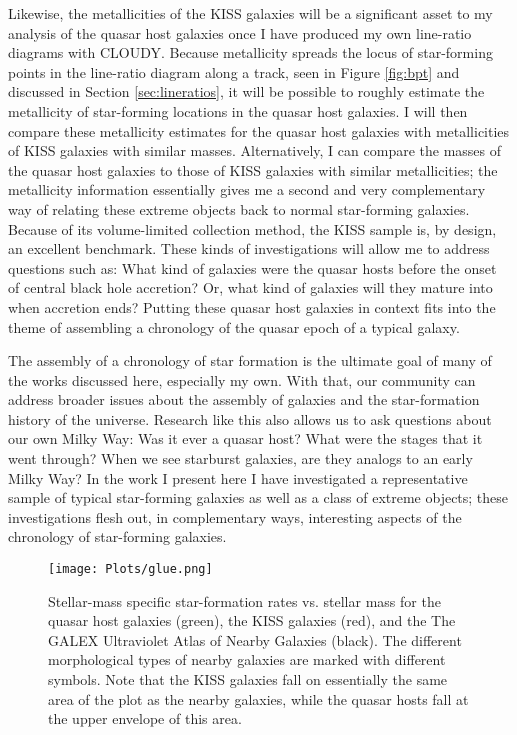 Likewise, the metallicities of the KISS galaxies will be a significant asset to my analysis of the quasar host galaxies once I have produced my own line-ratio diagrams with CLOUDY.  Because metallicity spreads the locus of star-forming points in the line-ratio diagram along a track, seen in Figure \ref{fig:bpt} and discussed in Section \ref{sec:lineratios}, it will be possible to roughly estimate the metallicity of star-forming locations in the quasar host galaxies.  I will then compare these metallicity estimates for the quasar host galaxies with metallicities of KISS galaxies with similar masses. Alternatively, I can compare the masses of the quasar host galaxies to those of KISS galaxies with similar metallicities; the metallicity information essentially gives me a second and very complementary way of relating these extreme objects back to normal star-forming galaxies.  Because of its volume-limited collection method, the KISS sample is, by design, an excellent benchmark.  These kinds of investigations will allow me to address questions such as: What kind of galaxies were the quasar hosts before the onset of central black hole accretion?  Or, what kind of galaxies will they mature into when accretion ends?  Putting these quasar host galaxies in context fits into the theme of assembling a chronology of the quasar epoch of a typical galaxy.

The assembly of a chronology of star formation is the ultimate goal of many of the works discussed here, especially my own.  With that, our community can address broader issues about the assembly of galaxies and the star-formation history of the universe.  Research like this also allows us to ask questions about our own Milky Way: Was it ever a quasar host?  What were the stages that it went through?  When we see starburst galaxies, are they analogs to an early Milky Way?  In the work I present here I have investigated a representative sample of typical star-forming galaxies as well as a class of extreme objects; these investigations flesh out, in complementary ways, interesting aspects of the chronology of star-forming galaxies.





\begin{figure}%
\begin{center}
 \texttt{[image: Plots/glue.png]}
  \caption{Stellar-mass specific star-formation rates  vs. stellar mass for the quasar host galaxies (green), the KISS galaxies (red), and the The GALEX Ultraviolet Atlas of Nearby Galaxies \citep{GildePaz} (black).  The different morphological types of nearby galaxies are marked with different symbols.  Note that the KISS galaxies fall on essentially the same area of the plot as the nearby galaxies, while the quasar hosts fall at the upper envelope of this area.}
\label{fig:glue}
\end{center}
\end{figure}

